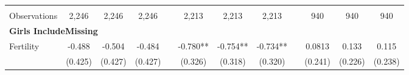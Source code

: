 \begin{landscape}
\begin{table}[htpb!]
\begin{center}
\begin{tabular}{lcccp{2mm}cccp{2mm}ccc}
\begin{footnotesize}\end{footnotesize}&\begin{footnotesize}\end{footnotesize}&\begin{footnotesize}\end{footnotesize}&\begin{footnotesize}\end{footnotesize}&\begin{footnotesize}\end{footnotesize}&\begin{footnotesize}\end{footnotesize}&\begin{footnotesize}\end{footnotesize}&\begin{footnotesize}\end{footnotesize}&\begin{footnotesize}\end{footnotesize}&\begin{footnotesize}\end{footnotesize}&\begin{footnotesize}\end{footnotesize}&\begin{footnotesize}\end{footnotesize}\\Observations&2,246&2,246&2,246&&2,213&2,213&2,213&&940&940&940\\
\multicolumn{12}{l}{\textbf{Girls IncludeMissing}}\\ 
Fertility&-0.488&-0.504&-0.484&&-0.780**&-0.754**&-0.734**&&0.0813&0.133&0.115\\
&(0.425)&(0.427)&(0.427)&&(0.326)&(0.318)&(0.320)&&(0.241)&(0.226)&(0.238)\\

\end{tabular}
\end{center}
\end{table}
\end{landscape}

